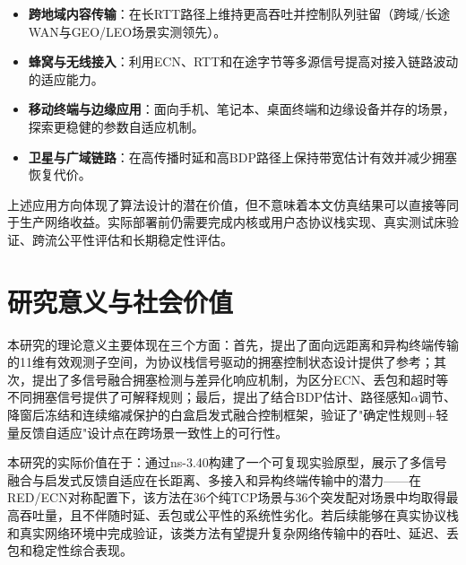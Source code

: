 \begin{itemize}
    \item \textbf{跨地域内容传输}：在长RTT路径上维持更高吞吐并控制队列驻留（跨域/长途WAN与GEO/LEO场景实测领先）。
    \item \textbf{蜂窝与无线接入}：利用ECN、RTT和在途字节等多源信号提高对接入链路波动的适应能力。
    \item \textbf{移动终端与边缘应用}：面向手机、笔记本、桌面终端和边缘设备并存的场景，探索更稳健的参数自适应机制。
    \item \textbf{卫星与广域链路}：在高传播时延和高BDP路径上保持带宽估计有效并减少拥塞恢复代价。
\end{itemize}

上述应用方向体现了算法设计的潜在价值，但不意味着本文仿真结果可以直接等同于生产网络收益。实际部署前仍需要完成内核或用户态协议栈实现、真实测试床验证、跨流公平性评估和长期稳定性评估。

\section{研究意义与社会价值}\label{Sec6.4}

本研究的理论意义主要体现在三个方面：首先，提出了面向远距离和异构终端传输的11维有效观测子空间，为协议栈信号驱动的拥塞控制状态设计提供了参考；其次，提出了多信号融合拥塞检测与差异化响应机制，为区分ECN、丢包和超时等不同拥塞信号提供了可解释规则；最后，提出了结合BDP估计、路径感知$\alpha$调节、降窗后冻结和连续缩减保护的白盒启发式融合控制框架，验证了"确定性规则+轻量反馈自适应"设计点在跨场景一致性上的可行性。

本研究的实际价值在于：通过ns-3.40构建了一个可复现实验原型，展示了多信号融合与启发式反馈自适应在长距离、多接入和异构终端传输中的潜力——在RED/ECN对称配置下，该方法在36个纯TCP场景与36个突发配对场景中均取得最高吞吐量，且不伴随时延、丢包或公平性的系统性劣化。若后续能够在真实协议栈和真实网络环境中完成验证，该类方法有望提升复杂网络传输中的吞吐、延迟、丢包和稳定性综合表现。

